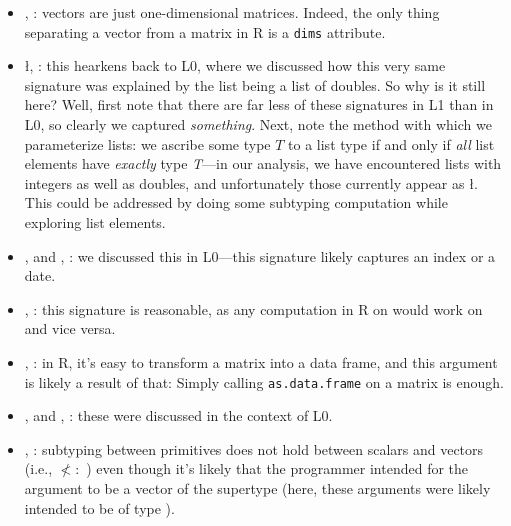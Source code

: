 \documentclass[acmsmall,10pt,review,anonymous]{acmart}\settopmatter{printfolios=true,printccs=false,printacmref=false}
\newcommand{\code}[1]{\lstinline|#1|\xspace}
\begin{document}
\begin{itemize}
	\item \D, : vectors are just one-dimensional matrices.
	Indeed, the only thing separating a vector from a matrix in R is a {\tt dims} attribute.
	
	\item \l, : this hearkens back to L0, where we discussed how this very same signature was explained by the list being a list of doubles.
	So why is it still here?
	Well, first note that there are far less of these signatures in L1 than in L0, so clearly we captured {\it something}.
	Next, note the method with which we parameterize lists: we ascribe some type $T$ to a list type  if and only if {\it all} list elements have {\it exactly} type {\it T}---in our analysis, we have encountered lists with integers as well as doubles, and unfortunately those currently appear as \l.
	This could be addressed by doing some subtyping computation while exploring list elements.
	
	\item \sC, \sD and \C, \D: we discussed this in L0---this signature likely captures an index or a date.
	
	\item {}, : this signature is reasonable, as any computation in R on  would work on  and vice versa.
	
	
	\item \df, : in R, it's easy to transform a matrix into a data frame, and this argument is likely a result of that:
	Simply calling \code{as.data.frame} on a matrix is enough.
	
	\item \sD, \sF and \sC, \sF: these were discussed in the context of L0.
	
	\item \I, \sD: subtyping between primitives does not hold between scalars and vectors (i.e., \I $\not<:$ \sD) even though it's likely that the programmer intended for the argument to be a vector of the supertype (here, these arguments were likely intended to be of type \D).
	
\end{itemize}
\end{document}
